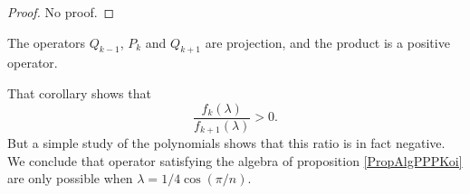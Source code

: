 \begin{proof}
No proof.
\end{proof}

\begin{corollary}
The operators $Q_{k-1}$, $P_k$ and $Q_{k+1}$ are projection, and the product is a positive operator.
\end{corollary}

That corollary shows that
\begin{equation}
	\frac{ f_k(\lambda) }{ f_{k+1}(\lambda) }>0.
\end{equation}
But a simple study of the polynomials shows that this ratio is in fact negative. We conclude that operator satisfying the algebra of proposition \eqref{PropAlgPPPKoi} are only possible when $\lambda=1/4\cos(\pi/n)$.
